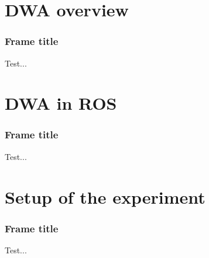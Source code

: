 \documentclass{beamer}
\begin{document}

\section{DWA overview}


\begin{frame}
\frametitle{Frame title}

Test...

\end{frame}




\section{DWA in ROS}


\begin{frame}
\frametitle{Frame title}

Test...

\end{frame}




\section{Setup of the experiment}


\begin{frame}
\frametitle{Frame title}

Test...

\end{frame}
\end{document}
